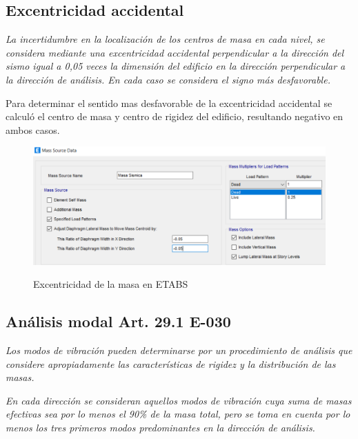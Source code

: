 \documentclass{article}%
\begin{document}
%
\subsection{Excentricidad accidental}%
\label{subsec:Excentricidadaccidental}%
\begin{tcolorbox}[colback=gray!5!white,colframe=Maroon!75!black,fonttitle=\bfseries,title=Art. 28.5]%
\textit{La incertidumbre en la localización de los centros de masa en cada nivel, se considera mediante una excentricidad accidental perpendicular a la dirección del sismo igual a 0,05 veces la dimensión del edificio en la dirección perpendicular a la dirección de análisis. En cada caso se considera el signo más desfavorable.}%
\end{tcolorbox}%
Para determinar el sentido mas desfavorable de la excentricidad accidental se calculó el centro de masa y centro de rigidez del edificio, resultando negativo en ambos casos.%


\begin{figure}[ht!]%
\centering%
\caption{Excentricidad de la masa en ETABS}%
\includegraphics[scale=0.7]{images/excentricidad.PNG}%
\label{masa}%
\end{figure}

%
\subsection{Análisis modal Art. 29.1 E{-}030}%
\label{subsec:AnlisismodalArt.29.1E{-}030}%
\begin{tcolorbox}[colback=gray!5!white,colframe=Maroon!75!black,fonttitle=\bfseries,title=Art. 29.1.1]%
\textit{Los modos de vibración pueden determinarse por un procedimiento de análisis que considere apropiadamente las características de rigidez y la distribución de las masas.}%
\end{tcolorbox}%
\begin{tcolorbox}[colback=gray!5!white,colframe=Maroon!75!black,fonttitle=\bfseries,title=Art. 29.1.2]%
\textit{En cada dirección se consideran aquellos modos de vibración cuya suma de masas efectivas sea por lo menos el 90\% de la masa total, pero se toma en cuenta por lo menos los tres primeros modos predominantes en la dirección de análisis.}%
\end{tcolorbox}%
%
\end{document}
